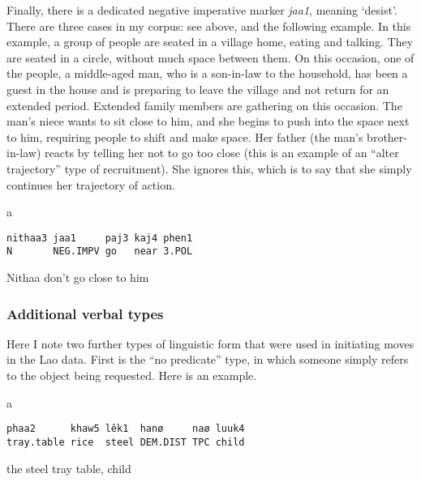 \documentclass[output=paper]{langsci/langscibook}
\begin{document}
\largerpage
Finally, there is a dedicated negative imperative marker \textit{jaa1}, meaning ‘desist’. There are three cases in my corpus: see  above, and the following example. In this example, a group of people are seated in a village home, eating and talking. They are seated in a circle, without much space between them. On this occasion, one of the people, a middle-aged man, who is a son-in-law to the household, has been a guest in the house and is preparing to leave the village and not return for an extended period. Extended family members are gathering on this occasion. The man’s niece wants to sit close to him, and she begins to push into the space next to him, requiring people to shift and make space. Her father (the man’s brother-in-law) reacts by telling her not to go too close (this is an example of an “alter trajectory” type of recruitment). She ignores this, which is to say that she simply continues her trajectory of action. %

\vspace{-1mm}
%
\begin{mdframednoverticalspace}[style=firstfoc]
\begin{transbox}{1}{a}
\begin{verbatim}
nithaa3 jaa1     paj3 kaj4 phen1
N       NEG.IMPV go   near 3.POL
\end{verbatim}
Nithaa don't go close to him
\end{transbox}
\end{mdframednoverticalspace}
%
\begin{mdframednoverticalspace}[style=secondfoc]
\end{mdframednoverticalspace}

\subsubsection{Additional verbal types}

Here I note two further types of linguistic form that were used in initiating moves in the Lao data. First is the “no predicate” type, in which someone simply refers to the object being requested. Here is an example.

\vspace{-1mm}
%
\begin{mdframednoverticalspace}[style=firstfoc]
\begin{transbox}{1}{a}
\begin{verbatim}
phaa2      khaw5 lêk1  hanø     naø luuk4
tray.table rice  steel DEM.DIST TPC child
\end{verbatim}
the steel tray table, child
\end{transbox}
\end{mdframednoverticalspace}
%
\begin{mdframednoverticalspace}[style=secondfoc]
\end{mdframednoverticalspace}
\end{document}
